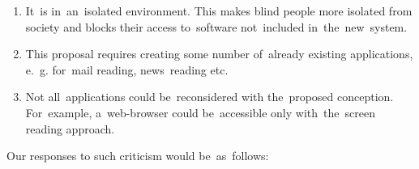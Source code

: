\documentclass{acm_proc_article-sp}
\begin{document}
\begin{enumerate}

\item {
It~is in~an~isolated environment.
This makes blind people more isolated from society 
and blocks their access to~software not~included in~the~new~system.
}

\item {
This proposal requires creating some number of~already existing applications,
e.~g. for~mail reading, news~reading etc.
}

\item {
Not all~applications could be~reconsidered with the~proposed conception.
For~example, a~web-browser could be~accessible only with~the~screen reading approach.
}

\end{enumerate}

Our responses to such criticism would be~as~follows:
\end{document}
